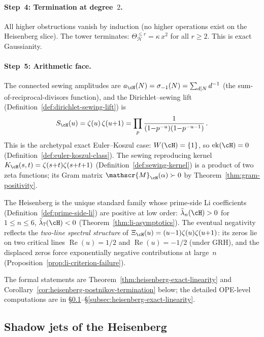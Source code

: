 \paragraph{Step~4: Termination at degree~$2$.}
All higher obstructions vanish by induction
(no higher operations exist on the Heisenberg slice).
The tower terminates:
$\Theta_{\mathcal{H}}^{\leq r} = \kappa\,x^2$ for all $r \geq 2$.
This is exact Gaussianity.

\paragraph{Step~5: Arithmetic face.}
The connected sewing amplitudes are $a_\cH(N) = \sigma_{-1}(N) =
\sum_{d \mid N}d^{-1}$ (the sum-of-reciprocal-divisors function),
and the Dirichlet--sewing lift
(Definition~\ref{def:dirichlet-sewing-lift}) is
\begin{equation}\label{eq:heisenberg-euler-product-example}
S_\cH(u) = \zeta(u)\,\zeta(u{+}1)
= \prod_p \frac{1}{(1{-}p^{-u})(1{-}p^{-u-1})}\,.
\end{equation}
This is the archetypal exact Euler--Koszul case:
$W(\cH) = \{1\}$, so $\operatorname{ek}(\cH) = 0$
(Definition~\ref{def:euler-koszul-class}).
The sewing reproducing kernel
$K_\cH(s,t) = \zeta(s{+}t)\zeta(s{+}t{+}1)$
(Definition~\ref{def:sewing-kernel})
is a product of two zeta functions; its Gram matrix
$\mathscr{M}_\cH(\alpha) \succ 0$
by Theorem~\ref{thm:gram-positivity}.

The Heisenberg is the unique standard family
whose prime-side Li coefficients
(Definition~\ref{def:prime-side-li})
are positive at low order:
$\tilde\lambda_n(\cH) > 0$ for $1 \leq n \leq 6$,
$\tilde\lambda_7(\cH) < 0$
(Theorem~\ref{thm:li-asymptotics}). The eventual negativity
reflects the \emph{two-line spectral structure} of
$\Xi_\cH(u) = (u{-}1)\zeta(u)\zeta(u{+}1)$: its zeros lie
on two critical lines
$\operatorname{Re}(u) = 1/2$ and
$\operatorname{Re}(u) = -1/2$
(under GRH), and the displaced zeros force exponentially
negative contributions at large~$n$
(Proposition~\ref{prop:li-criterion-failure}).

\medskip
The formal statements are
Theorem~\ref{thm:heisenberg-exact-linearity} and
Corollary~\ref{cor:heisenberg-postnikov-termination} below;
the detailed OPE-level computations are in
\S\ref{subsec:heisenberg-shadow-jets}--\S\ref{subsec:heisenberg-exact-linearity}.

\subsection{Shadow jets of the Heisenberg}
\label{subsec:heisenberg-shadow-jets}

